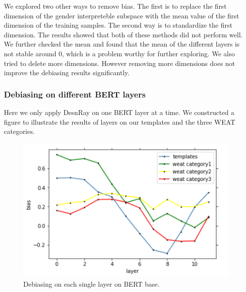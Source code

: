 We explored two other ways to remove bias. The first is to replace the first dimension of the gender interpreteble subspace with the mean value of the first dimension of the training samples. The second way is to standardize the first dimension. The results showed that both of these methods did not perform well. We further checked the mean and found that the mean of the different layers is not stable around 0, which is a problem worthy for further exploring. We also tried to delete more dimensions. However removing more dimensions does not improve the debiasing results significantly.


\subsubsection{Debiasing on different BERT layers}
Here we only apply DesnRay on one BERT layer at a time. We constructed a figure  to illustrate the results of layers on our templates and the three WEAT categories.
\begin{figure}
	\centering
	\includegraphics[width=0.9\linewidth]{layers_base}
	\caption{Debiasing on each single layer on BERT base.}
	\label{fig:layersbase}
\end{figure}

